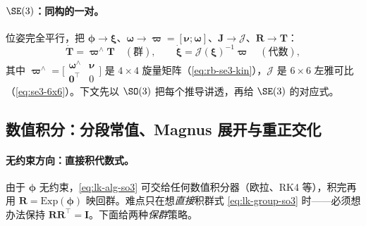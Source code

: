 \paragraph{$\SE(3)$：同构的一对。}位姿完全平行，把 $\boldsymbol{\phi}\to\boldsymbol{\xi}$、$\boldsymbol{\omega}\to\boldsymbol{\varpi}=[\boldsymbol{\nu};\boldsymbol{\omega}]$、$\mathbf{J}\to\boldsymbol{\mathcal{J}}$、$\mathbf{R}\to\mathbf{T}$：
\begin{equation}
  \dot{\mathbf{T}}=\boldsymbol{\varpi}^\wedge\mathbf{T}\quad(\text{群}),\qquad
  \dot{\boldsymbol{\xi}}=\boldsymbol{\mathcal{J}}(\boldsymbol{\xi})^{-1}\boldsymbol{\varpi}\quad(\text{代数}),
  \label{eq:lk-se3}
\end{equation}
其中 $\boldsymbol{\varpi}^\wedge=\big[\begin{smallmatrix}\boldsymbol{\omega}^\wedge&\boldsymbol{\nu}\\\mathbf{0}^\top&0\end{smallmatrix}\big]$ 是 $4\times4$ 旋量矩阵（\cref{eq:rb-se3-kin}），$\boldsymbol{\mathcal{J}}$ 是 $6\times6$ 左雅可比（\cref{eq:se3-6x6}）。下文先以 $\SO(3)$ 把每个推导讲透，再给 $\SE(3)$ 的对应式。

\subsection{数值积分：分段常值、Magnus 展开与重正交化}
\label{subsec:lie-numint}

\paragraph{无约束方向：直接积代数式。}由于 $\boldsymbol{\phi}$ 无约束，\cref{eq:lk-alg-so3} 可交给任何数值积分器（欧拉、RK4 等），积完再用 $\mathbf{R}=\mathrm{Exp}(\boldsymbol{\phi})$ 映回群。难点只在想\emph{直接}积群式 \cref{eq:lk-group-so3} 时——必须想办法保持 $\mathbf{R}\mathbf{R}^\top=\mathbf{I}$。下面给两种\emph{保群}策略。

